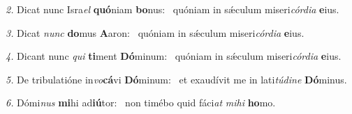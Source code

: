 \begin{psalmus}
\textit{\color{red}2.} Dicat nunc Isra\textit{el} \textbf{quó}niam \textbf{bo}nus:~\grestar{}
quóniam in sǽculum miseri\textit{cór}\textit{di}\textit{a} \textbf{e}ius.~\Abardot{}

\textit{\color{red}3.} Dicat \textit{nunc} \textbf{do}mus \textbf{A}aron:~\grestar{}
quóniam in sǽculum miseri\textit{cór}\textit{di}\textit{a} \textbf{e}ius.~\Abardot{}

\textit{\color{red}4.} Dicant nunc \textit{qui} \textbf{ti}ment \textbf{Dó}minum:~\grestar{}
quóniam in sǽculum miseri\textit{cór}\textit{di}\textit{a} \textbf{e}ius.~\Abardot{}

\textit{\color{red}5.} De tribulatióne in\textit{vo}\textbf{cá}vi \textbf{Dó}minum:~\grestar{}
et exaudívit me in lati\textit{tú}\textit{di}\textit{ne} \textbf{Dó}minus.~\Abardot{}

\textit{\color{red}6.} Dómi\textit{nus} \textbf{mi}hi ad\textbf{iú}tor:~\grestar{}
non timébo quid fáci\textit{at} \textit{mi}\textit{hi} \textbf{ho}mo.~\Abardot{}
\end{psalmus}

